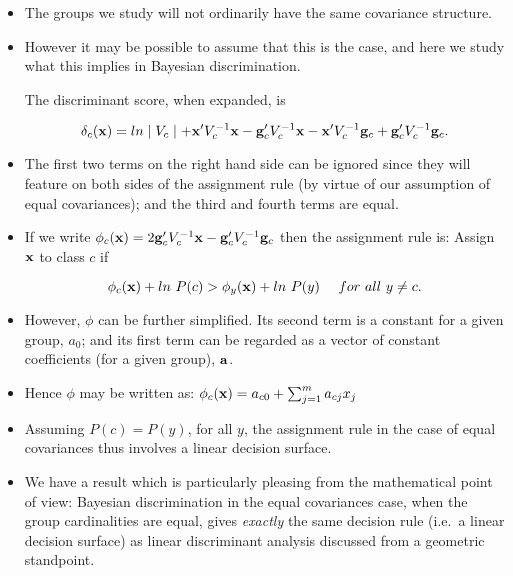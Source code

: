 \documentclass[a4,dvips]{seminar}
\newcommand{\heading}[1]{%
  \begin{center}
    \large\bf
    \shadowbox{#1}%
  \end{center}
  \vspace{1ex minus 1ex}}
\begin{document}
\begin{slide}
\textcolor {reddish} {\heading{Bayesian Equal Covariances Case}}
\begin{itemize}
\item The groups we study will not ordinarily have the same covariance
structure.  
\item However it may be possible to assume that this is the
case, and here we study what this implies in Bayesian discrimination.

The discriminant score, when 
expanded, is

$$ \delta_c({\bf x}) = ln \mid V_c \mid 
             + {\bf x}^\prime V^{-1}_c {\bf x}
             - {\bf g}^\prime_c V^{-1}_c {\bf x}
             - {\bf x}^\prime V^{-1}_c {\bf g}_c
             + {\bf g}^\prime_c V^{-1}_c {\bf g}_c  . $$

\item The first two terms on the right hand side can be ignored since they will
feature on both sides of the assignment rule (by virtue of our assumption
of equal covariances); and the third and
fourth terms are equal.  
\item If we write
$ \phi_c({\bf x}) = 2 {\bf g}^\prime_c V^{-1}_c {\bf x} - 
             {\bf g}^\prime_c V^{-1}_c {\bf g}_c $ then
the assignment rule is: Assign ${\bf x}$ to class $c$ if

$$ \phi_c({\bf x}) + ln \ P(c) > \phi_y({\bf x}) + ln \ P(y)              
 \ \ \ \ for  \ all  \ y \neq c .  $$

\item However, $\phi$ can be further simplified.  Its second term is a constant
for a given group, $a_0$; and its first term can be regarded as a vector
of constant coefficients (for a given group), ${\bf a}$.  
\item Hence $\phi$
may be written as:
$ \phi_c({\bf x}) = a_{c0} + \sum^m_{j=1} a_{cj} x_j   $

\item Assuming $P(c) = P(y)$, for all $y$, the assignment rule in the case of
equal covariances thus involves a linear decision surface.  
\item We have a
result which is particularly pleasing from the mathematical point of
view: Bayesian discrimination in the equal covariances case, when the
group cardinalities are equal, gives {\sl exactly} the same decision
rule (i.e.\ a linear decision surface) as linear discriminant 
analysis discussed from a geometric standpoint. 
\end{itemize}
\end{slide}
\end{document}
